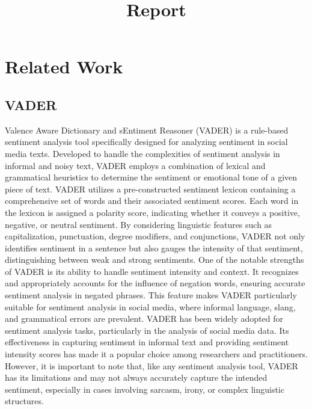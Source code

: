 
\title{Report}
\section{Related Work}
\subsection{VADER}
Valence Aware Dictionary and sEntiment Reasoner (VADER) is a rule-based sentiment analysis tool specifically designed for analyzing sentiment in social media texts. Developed to handle the complexities of sentiment analysis in informal and noisy text, VADER employs a combination of lexical and grammatical heuristics to determine the sentiment or emotional tone of a given piece of text.
VADER utilizes a pre-constructed sentiment lexicon containing a comprehensive set of words and their associated sentiment scores. Each word in the lexicon is assigned a polarity score, indicating whether it conveys a positive, negative, or neutral sentiment. By considering linguistic features such as capitalization, punctuation, degree modifiers, and conjunctions, VADER not only identifies sentiment in a sentence but also gauges the intensity of that sentiment, distinguishing between weak and strong sentiments.
One of the notable strengths of VADER is its ability to handle sentiment intensity and context. It recognizes and appropriately accounts for the influence of negation words, ensuring accurate sentiment analysis in negated phrases. This feature makes VADER particularly suitable for sentiment analysis in social media, where informal language, slang, and grammatical errors are prevalent.
VADER has been widely adopted for sentiment analysis tasks, particularly in the analysis of social media data. Its effectiveness in capturing sentiment in informal text and providing sentiment intensity scores has made it a popular choice among researchers and practitioners. However, it is important to note that, like any sentiment analysis tool, VADER has its limitations and may not always accurately capture the intended sentiment, especially in cases involving sarcasm, irony, or complex linguistic structures.
